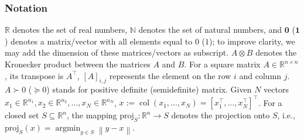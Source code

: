 \documentclass{IEEEtran}  %
\newcommand{\bs}{\boldsymbol}
\newcommand{\mc}{\mathcal}
\newcommand{\bb}{\mathbb}
\newcommand{\R}{\bb R}
\newcommand{\argmin}{\operatorname{argmin}}
\newcommand{\fix}{\mathrm{fix}}
\newcommand{\proj}{\mathrm{proj}}
\newcommand{\Id}{\mathrm{Id}}
\newcommand{\col}{\operatorname{col}}
\newcommand{\zer}{\operatorname{zer}}
\newcommand{\nc}{\mathrm{N}}
\newcommand{\0}{\mathbf{0}}
\newcommand{\1}{\mathbf{1}}
\newcommand{\edit}[1]{\color{blue}{#1}\color{black}}
\newcommand{\note}[1]{\textcolor{blue}{\texttt{#1}}}
\begin{document}
\smallskip
\subsubsection*{Notation}
$\R$ denotes the set of real numbers, $\bb N$ denotes the set of natural numbers, and  $\bs{0}$ ($\bs{1}$) denotes a matrix/vector with all elements equal to $0$ ($1$); to improve clarity, we may add the dimension of these matrices/vectors as subscript. $A \otimes B$ denotes the Kronecker product between the matrices $A$ and $B$. For a square matrix $A \in \R^{n \times n}$, its transpose is $A^\top$, $[A]_{i,j}$ represents the element on the row $i$ and column $j$. $A \succ 0$ ($\succcurlyeq 0$) stands for positive definite (semidefinite) matrix. Given $N$ vectors $x_1 \in \bb R^{n_1}, x_2 \in \bb R^{n_2},\ldots, x_N \in \R^{n_N}$, $x := \col\left(x_1,\ldots,x_N\right) = [ x_1^\top, \ldots , x_N^\top ]^\top$. \marginnote{\note{R4-9}}\edit{Given $x \in \bb R^n$, $\|x\|_A^2 = x^\top A x,$ with square matrix $A \succ 0$.}
For a closed set $S \subseteq \R^n$, the mapping $\proj_{S}:\R^n \rightarrow S$ denotes the projection onto $S$, i.e., $\proj_{S}(x) = \argmin_{y \in S} \left\| y - x\right\|$. 

\end{document}
